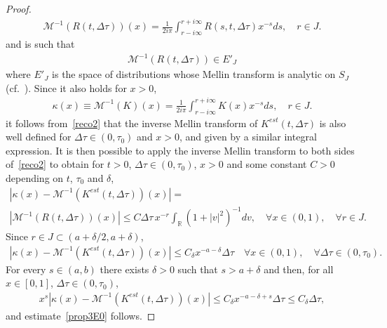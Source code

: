 \documentclass[AHL,Unicode,longabstracts,published]{cedram}
\newcommand*\R{\mathbb{R}}
\newcommand*\M{\mathcal{M}}
\let\oldforall\forall
\renewcommand*{\forall}{\mathrel{\oldforall}}
\begin{document}
\begin{proof}
\begin{align*}
\M^{-1}(R(t, \Delta \tau))(x)=\frac {1} {2i\pi }\int _{ r-i\infty }^{r+i\infty} R(s, t, \Delta \tau)x^{-s}ds,\quad r\in J.
\end{align*}
and is such that
\begin{align*}
\M^{-1}(R(t, \Delta \tau))\in E'_{ J }
\end{align*}
where $ E' _{ J }$ is the space of distributions whose Mellin transform is analytic on $S_J$ (cf.~\cite{ML}). Since it also holds for $x>0$,
\begin{align*}
\kappa (x)\equiv\M^{-1}(K)(x)= \frac {1} {2i\pi }\int _{ r-i\infty }^{r+i\infty} K(x) x^{-s}ds,\quad r\in J.
\end{align*}
it follows from~\eqref{reco2} that the inverse Mellin transform of $K^{est}(t, \Delta \tau)$ is also well defined for $\Delta \tau \in (0, \tau _0)$ and $x>0$, and given by a similar integral expression. It is then possible to apply the inverse Mellin transform to both sides of~\eqref{reco2} to obtain for $t>0$, $\Delta \tau \in (0, \tau _0)$, $x>0$ and some constant $C>0$ depending on $t$, $\tau _0$ and $\delta $,
\begin{multline*}
\left|\kappa (x) -\M^{-1}\left(K^{est}(t, \Delta \tau)\right)(x)\right|=\\
\left|\M^{-1}(R(t, \Delta \tau))(x)\right|\le C\Delta \tau\, x^{-r}\int _{\R} \left(1+|v|^2\right)^{-1}dv,\quad\forall x\in (0, 1),\quad\forall r\in J.
\end{multline*}
Since $r\in J\subset (a+\delta/2, a+\delta)$,
\begin{align*}
\left|\kappa (x)-\M^{-1}\left(K^{est}(t, \Delta \tau) \right)(x)\right|\le C_\delta x^{-a-\delta} \Delta \tau\quad\forall x\in (0, 1),\quad\forall \Delta \tau\in (0, \tau _0).
\end{align*}
For every $s\in (a, b)$ there exists $\delta >0$ such that $s>a+\delta $ and then, for all $x\in [0, 1]$, $\Delta \tau\in (0, \tau _0)$,
\begin{align*}
x^s\left|\kappa (x)-\M^{-1}\left(K^{est}(t, \Delta \tau) \right)(x)\right|\le C_\delta x^{-a-\delta+s } \Delta \tau\le C_\delta \Delta \tau,
\end{align*}
and estimate~\eqref{prop3E0} follows.
\end{proof}
\end{document}
